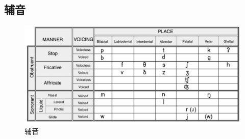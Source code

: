\documentclass[a4paper]{article}
\begin{document}
\subsection{辅音}
\begin{figure}[H]
\centering
\includegraphics[width=1\textwidth]{cons.png}
\caption{辅音}
\end{figure}
\end{document}
